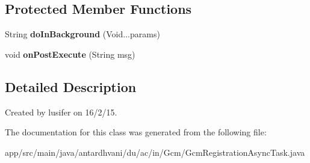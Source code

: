 \subsection*{Protected Member Functions}
\begin{DoxyCompactItemize}
\item 
\hypertarget{classantardhvani_1_1du_1_1ac_1_1in_1_1_gcm_1_1_gcm_registration_async_task_a7fda0832e3b1891bdefbc1880d1b9ee7}{}String {\bfseries do\+In\+Background} (Void...\+params)\label{classantardhvani_1_1du_1_1ac_1_1in_1_1_gcm_1_1_gcm_registration_async_task_a7fda0832e3b1891bdefbc1880d1b9ee7}

\item 
\hypertarget{classantardhvani_1_1du_1_1ac_1_1in_1_1_gcm_1_1_gcm_registration_async_task_a7fef1c624f16c575a4e07890972913ba}{}void {\bfseries on\+Post\+Execute} (String msg)\label{classantardhvani_1_1du_1_1ac_1_1in_1_1_gcm_1_1_gcm_registration_async_task_a7fef1c624f16c575a4e07890972913ba}

\end{DoxyCompactItemize}


\subsection{Detailed Description}
Created by lusifer on 16/2/15. 

The documentation for this class was generated from the following file\+:\begin{DoxyCompactItemize}
\item 
app/src/main/java/antardhvani/du/ac/in/\+Gcm/Gcm\+Registration\+Async\+Task.\+java\end{DoxyCompactItemize}
